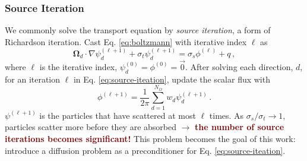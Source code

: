 \documentclass[xcolor={usenames,dvipsnames,svgnames,table}]{beamer}
\newcommand{\vo}{\pmb{\Omega}} %
\begin{document}
\begin{frame}\frametitle{Source Iteration}
	We commonly solve the transport equation by \textit{source iteration}, a form of Richardson iteration. Cast Eq. \eqref{eq:boltzmann} with iterative index $\ell$ as
	\begin{equation}
		\label{eq:source-iteation}
		\vo_d \cdot \nabla \psi_d^{(\ell + 1)} + \sigma_t \psi_d^{(\ell + 1)} = \sigma_s \phi^{(\ell)} + q\,,
	\end{equation}
	where $\ell$ is the iterative index, $\psi_d^{(0)} = \phi^{(0)} = \vec{0}$. After solving each direction, $d$, for an iteration $\ell$ in Eq. \eqref{eq:source-iteation}, update the scalar flux with
	\[
		\phi^{(\ell + 1)} = \frac{1}{2\pi} \sum_{d = 1}^{N_\Omega} w_d \psi_d^{(\ell + 1)}\,.
	\]
	$\psi^{(\ell + 1)}$ is the particles that have scattered at most $\ell$ times. As $\sigma_s / \sigma_t \to 1$, particles scatter more before they are absorbed $\rightarrow$ \textbf{\textcolor{Maroon}{the number of source iterations becomes significant!}} This problem becomes the goal of this work: introduce a diffusion problem as a preconditioner for Eq. \eqref{eq:source-iteation}.
\end{frame}

\end{document}

